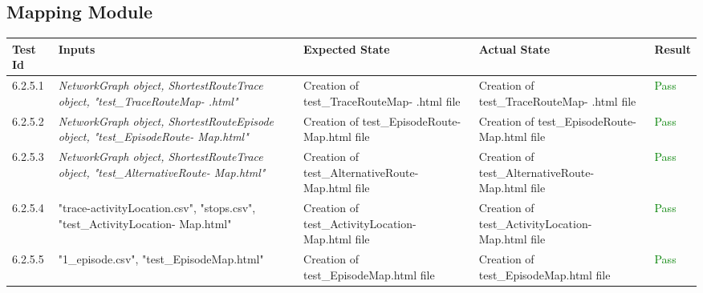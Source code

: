 \documentclass[12pt, titlepage]{article}
\begin{document}
\subsection{Mapping Module}
\begin{tabular}{ | m{3.5em} | m{4cm}| m{4cm} | m{4cm} | m{1.2cm} | }
  \hline
  \textbf{Test Id}& \textbf{Inputs} & \textbf{Expected State} & \textbf{Actual State} & \textbf{Result} \\ 
  \hline
  6.2.5.1 & \textit{NetworkGraph object, ShortestRouteTrace object, "test\_TraceRouteMap- .html"} & Creation of test\_TraceRouteMap- .html file & Creation of test\_TraceRouteMap- .html file & \textcolor{green}{Pass} \\ 
  \hline
  6.2.5.2 & \textit{NetworkGraph object, ShortestRouteEpisode object, "test\_EpisodeRoute- Map.html"} & Creation of test\_EpisodeRoute- Map.html file & Creation of test\_EpisodeRoute- Map.html file & \textcolor{green}{Pass} \\
  \hline
  6.2.5.3 & \textit{NetworkGraph object, ShortestRouteTrace object, "test\_AlternativeRoute- Map.html"} & Creation of test\_AlternativeRoute- Map.html file & Creation of test\_AlternativeRoute- Map.html file & \textcolor{green}{Pass} \\
  \hline
  6.2.5.4 & "trace-activityLocation.csv", "stops.csv", "test\_ActivityLocation- Map.html" & Creation of test\_ActivityLocation- Map.html file & Creation of test\_ActivityLocation- Map.html file & \textcolor{green}{Pass} \\
  \hline
  6.2.5.5 & "1\_episode.csv", "test\_EpisodeMap.html" & Creation of test\_EpisodeMap.html file & Creation of test\_EpisodeMap.html file & \textcolor{green}{Pass} \\
  \hline
\end{tabular}
\end{document}
